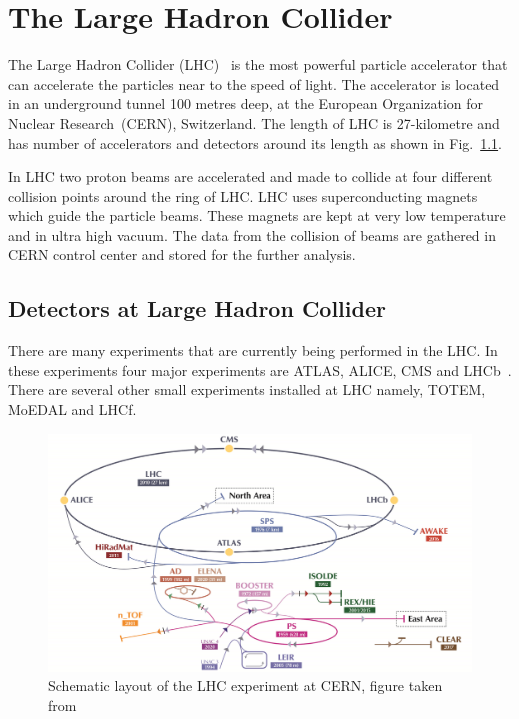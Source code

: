 


\chapter{The Large Hadron Collider}

The Large Hadron Collider (LHC)~\cite{Collider:1998498} is the most powerful particle accelerator that can accelerate the particles near to the speed of light. The accelerator is located  in an underground tunnel 100 metres deep, at the European Organization for Nuclear Research~(CERN), Switzerland. The length of LHC is 27-kilometre and has number of accelerators and detectors around its length as shown in Fig.~\ref{LHC_exp}.

In LHC two proton beams are accelerated and made to collide at four different collision points around the ring of LHC. LHC uses superconducting magnets which guide the particle beams. These magnets are kept at very low temperature and in ultra high vacuum. The data from the collision of beams are gathered in CERN control center and stored for the further analysis.


\section{Detectors at Large Hadron Collider}\label{1.1}
There are many experiments that are currently being performed in the LHC. In these experiments four major experiments are ATLAS, ALICE, CMS and LHCb~\cite{Mobs:2684277}. There are several other small experiments installed at LHC namely, TOTEM, MoEDAL and LHCf. 
\begin{figure}[h]
\includegraphics[scale=0.25]{chapter2/Cern_complex.jpg}
\caption{Schematic layout of the LHC experiment at CERN, figure taken from~\cite{Mobs:2684277}}
\label{LHC_exp}
\end{figure}
